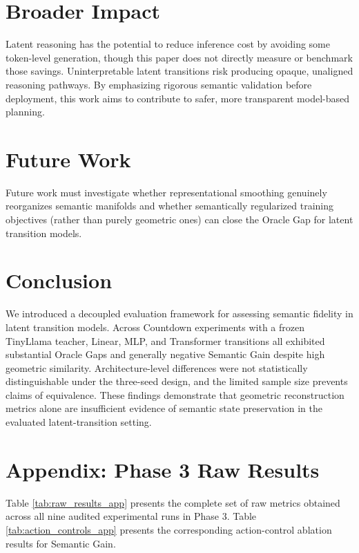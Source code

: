\documentclass[conference]{IEEEtran}
\begin{document}
\section{Broader Impact}
Latent reasoning has the potential to reduce inference cost by avoiding some token-level generation, though this paper does not directly measure or benchmark those savings. Uninterpretable latent transitions risk producing opaque, unaligned reasoning pathways. By emphasizing rigorous semantic validation before deployment, this work aims to contribute to safer, more transparent model-based planning.

\section{Future Work}
Future work must investigate whether representational smoothing genuinely reorganizes semantic manifolds and whether semantically regularized training objectives (rather than purely geometric ones) can close the Oracle Gap for latent transition models.

\section{Conclusion}
We introduced a decoupled evaluation framework for assessing semantic fidelity in latent transition models. Across Countdown experiments with a frozen TinyLlama teacher, Linear, MLP, and Transformer transitions all exhibited substantial Oracle Gaps and generally negative Semantic Gain despite high geometric similarity. Architecture-level differences were not statistically distinguishable under the three-seed design, and the limited sample size prevents claims of equivalence. These findings demonstrate that geometric reconstruction metrics alone are insufficient evidence of semantic state preservation in the evaluated latent-transition setting.

\section*{Appendix: Phase 3 Raw Results}
Table \ref{tab:raw_results_app} presents the complete set of raw metrics obtained across all nine audited experimental runs in Phase 3. Table \ref{tab:action_controls_app} presents the corresponding action-control ablation results for Semantic Gain.
\end{document}
